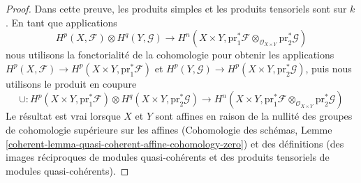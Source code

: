 \begin{proof}
Dans cette preuve, les produits simples et les produits tensoriels sont sur $k$. En tant que applications
$$
H^p(X, \mathcal{F}) \otimes H^q(Y, \mathcal{G})
\longrightarrow
H^n(X \times Y, \text{pr}_1^*\mathcal{F}
\otimes_{\mathcal{O}_{X \times Y}} \text{pr}_2^*\mathcal{G})
$$
nous utilisons la fonctorialité de la cohomologie pour obtenir
les applications $H^p(X, \mathcal{F}) \to H^p(X \times Y,
\text{pr}_1^*\mathcal{F})$ et $H^p(Y, \mathcal{G}) \to H^p(X \times Y,
\text{pr}_2^*\mathcal{G})$, puis nous utilisons le produit en coupure
$$
\cup :
H^p(X \times Y, \text{pr}_1^*\mathcal{F})
\otimes H^q(X \times Y, \text{pr}_2^*\mathcal{G})
\longrightarrow
H^n(X \times Y, \text{pr}_1^*\mathcal{F}
\otimes_{\mathcal{O}_{X \times Y}} \text{pr}_2^*\mathcal{G})
$$
Le résultat est vrai lorsque $X$ et $Y$ sont affines en raison de la
nullité des groupes de cohomologie supérieure sur les affines
(Cohomologie des schémas, Lemme
\ref{coherent-lemma-quasi-coherent-affine-cohomology-zero}) et des définitions (des images
réciproques de modules quasi-cohérents et des produits tensoriels de modules quasi-cohérents).


\end{proof}
